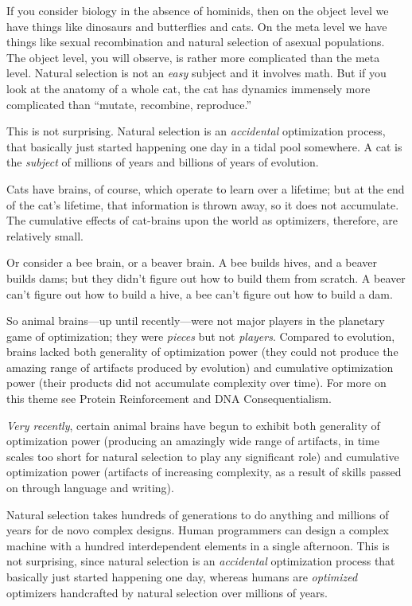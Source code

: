 {
 If you consider biology in the absence of hominids, then on the
object level we have things like dinosaurs and butterflies and cats. On
the meta level we have things like sexual recombination and natural
selection of asexual populations. The object level, you will observe,
is rather more complicated than the meta level. Natural selection is
not an \textit{easy} subject and it involves math. But if you look at
the anatomy of a whole cat, the cat has dynamics immensely more
complicated than ``mutate, recombine,
reproduce.''}

{
 This is not surprising. Natural selection is an
\textit{accidental} optimization process, that basically just started
happening one day in a tidal pool somewhere. A cat is the
\textit{subject} of millions of years and billions of years of
evolution.}

{
 Cats have brains, of course, which operate to learn over a
lifetime; but at the end of the cat's lifetime, that
information is thrown away, so it does not accumulate. The cumulative
effects of cat-brains upon the world as optimizers, therefore, are
relatively small.}

{
 Or consider a bee brain, or a beaver brain. A bee builds hives,
and a beaver builds dams; but they didn't figure out
how to build them from scratch. A beaver can't figure
out how to build a hive, a bee can't figure out how to
build a dam.}

{
 So animal brains---up until recently---were not major players in
the planetary game of optimization; they were \textit{pieces} but not
\textit{players}. Compared to evolution, brains lacked both generality
of optimization power (they could not produce the amazing range of
artifacts produced by evolution) and cumulative optimization power
(their products did not accumulate complexity over time). For more on
this theme see Protein Reinforcement and DNA Consequentialism.}

{
 \textit{Very recently}, certain animal brains have begun to
exhibit both generality of optimization power (producing an amazingly
wide range of artifacts, in time scales too short for natural selection
to play any significant role) and cumulative optimization power
(artifacts of increasing complexity, as a result of skills passed on
through language and writing).}

{
 Natural selection takes hundreds of generations to do anything and
millions of years for de novo complex designs. Human programmers can
design a complex machine with a hundred interdependent elements in a
single afternoon. This is not surprising, since natural selection is an
\textit{accidental} optimization process that basically just started
happening one day, whereas humans are \textit{optimized} optimizers
handcrafted by natural selection over millions of years.}

